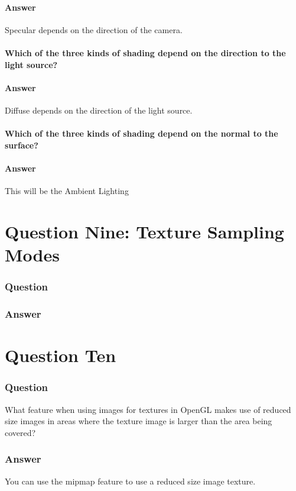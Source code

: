 \documentclass{report}
\begin{document}
\subsection{Answer}
Specular depends on the direction of the camera.
\subsection{ Which of the three kinds of shading depend on the direction to the light source?}
\subsection{Answer}
Diffuse depends on the direction of the light source.
\subsection{ Which of the three kinds of shading depend on the normal to the surface?}
\subsection{Answer}
This will be the Ambient Lighting
\part{Question Nine: Texture Sampling Modes}
\section{Question}
\section{Answer}
\part{Question Ten}
\section{Question}
What feature when using images for textures in OpenGL makes use of reduced size images in areas where the texture image is larger than the area being covered?
\section{Answer}
You can use the mipmap feature to use a reduced size image texture.
\end{document}
